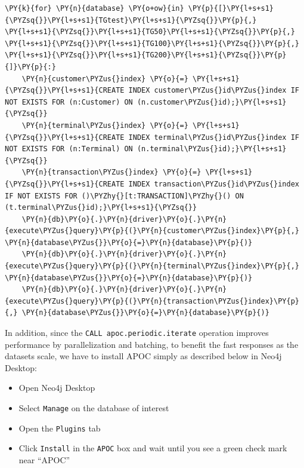     \begin{tcolorbox}[breakable, size=fbox, boxrule=1pt, pad at break*=1mm,colback=cellbackground, colframe=cellborder]
\begin{Verbatim}[commandchars=\\\{\}]
\PY{k}{for} \PY{n}{database} \PY{o+ow}{in} \PY{p}{[}\PY{l+s+s1}{\PYZsq{}}\PY{l+s+s1}{TGtest}\PY{l+s+s1}{\PYZsq{}}\PY{p}{,} \PY{l+s+s1}{\PYZsq{}}\PY{l+s+s1}{TG50}\PY{l+s+s1}{\PYZsq{}}\PY{p}{,} \PY{l+s+s1}{\PYZsq{}}\PY{l+s+s1}{TG100}\PY{l+s+s1}{\PYZsq{}}\PY{p}{,} \PY{l+s+s1}{\PYZsq{}}\PY{l+s+s1}{TG200}\PY{l+s+s1}{\PYZsq{}}\PY{p}{]}\PY{p}{:}
    \PY{n}{customer\PYZus{}index} \PY{o}{=} \PY{l+s+s1}{\PYZsq{}}\PY{l+s+s1}{CREATE INDEX customer\PYZus{}id\PYZus{}index IF NOT EXISTS FOR (n:Customer) ON (n.customer\PYZus{}id);}\PY{l+s+s1}{\PYZsq{}}
    \PY{n}{terminal\PYZus{}index} \PY{o}{=} \PY{l+s+s1}{\PYZsq{}}\PY{l+s+s1}{CREATE INDEX terminal\PYZus{}id\PYZus{}index IF NOT EXISTS FOR (n:Terminal) ON (n.terminal\PYZus{}id);}\PY{l+s+s1}{\PYZsq{}}
    \PY{n}{transaction\PYZus{}index} \PY{o}{=} \PY{l+s+s1}{\PYZsq{}}\PY{l+s+s1}{CREATE INDEX transaction\PYZus{}id\PYZus{}index IF NOT EXISTS FOR ()\PYZhy{}[t:TRANSACTION]\PYZhy{}() ON (t.terminal\PYZus{}id);}\PY{l+s+s1}{\PYZsq{}}
    \PY{n}{db}\PY{o}{.}\PY{n}{driver}\PY{o}{.}\PY{n}{execute\PYZus{}query}\PY{p}{(}\PY{n}{customer\PYZus{}index}\PY{p}{,} \PY{n}{database\PYZus{}}\PY{o}{=}\PY{n}{database}\PY{p}{)}
    \PY{n}{db}\PY{o}{.}\PY{n}{driver}\PY{o}{.}\PY{n}{execute\PYZus{}query}\PY{p}{(}\PY{n}{terminal\PYZus{}index}\PY{p}{,} \PY{n}{database\PYZus{}}\PY{o}{=}\PY{n}{database}\PY{p}{)}
    \PY{n}{db}\PY{o}{.}\PY{n}{driver}\PY{o}{.}\PY{n}{execute\PYZus{}query}\PY{p}{(}\PY{n}{transaction\PYZus{}index}\PY{p}{,} \PY{n}{database\PYZus{}}\PY{o}{=}\PY{n}{database}\PY{p}{)}
\end{Verbatim}
\end{tcolorbox}

    In addition, since the \texttt{CALL\ apoc.periodic.iterate} operation
improves performance by parallelization and batching, to benefit the
fast responses as the datasets scale, we have to install APOC simply as
described below in Neo4j Desktop:

\begin{itemize}
\tightlist
\item
  Open Neo4j Desktop
\item
  Select \texttt{Manage} on the database of interest
\item
  Open the \texttt{Plugins} tab
\item
  Click \texttt{Install} in the \texttt{APOC} box and wait until you see
  a green check mark near ``APOC''
\end{itemize}

